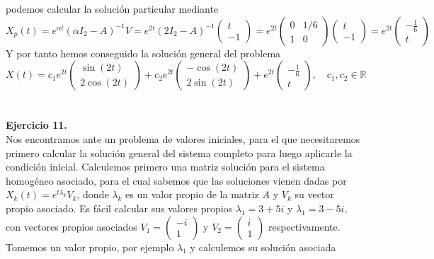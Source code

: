 \documentclass[fleqn]{article}
\def\R{\mathds{R}}
\begin{document}
    podemos calcular la solución particular mediante
    $$X_p(t) = e^{\alpha t} (\alpha I_2 -A)^{-1} V = e^{2t} (2I_2 - A)^{-1} \begin{pmatrix} t \\ -1 \end{pmatrix} = 
    e^{2t} 
    \begin{pmatrix}
        0 & 1/6 \\
        1 & 0
    \end{pmatrix}
    \begin{pmatrix} t \\ -1 \end{pmatrix} = 
    e^{2t} \begin{pmatrix} -\frac{1}{6} \\ t \end{pmatrix} 
    $$
    Y por tanto hemos conseguido la solución general del problema
    $$
    X(t) = c_1 e^{2t}
    \begin{pmatrix}
        \sin(2t)\\
        2\cos(2t)
    \end{pmatrix}
    + c_2 e^{2t}
    \begin{pmatrix}
        -\cos(2t)\\
        2\sin(2t)
    \end{pmatrix}
    + e^{2t} \begin{pmatrix} -\frac{1}{6} \\ t \end{pmatrix}, \quad c_1,c_2 \in \R
    $$\\ \\

    \textbf{Ejercicio 11. } \\
    
    Nos encontramos ante un problema de valores iniciales, para el que necesitaremos primero calcular la solución general del sistema completo para luego aplicarle la condición inicial.
    Calculemos primero una matriz solución para el sistema homogéneo asociado, para el cual sabemos que las soluciones vienen dadas por $X_k(t)=e^{t\lambda_k}V_k$, donde $\lambda_k$ es un 
    valor propio de la matriz $A$ y $V_k$ su vector propio asociado. Es fácil calcular sus valores propios $\lambda_1 = 3+5i$ y $\lambda_1 = 3-5i$, con vectores propios asociados
    $V_1 = \begin{pmatrix} -i\\1 \end{pmatrix}$ y $V_2 = \begin{pmatrix} i\\1 \end{pmatrix}$ respectivamente. Tomemos un valor propio, por ejemplo $\lambda_1$ y calculemos su solución asociada
\end{document}
